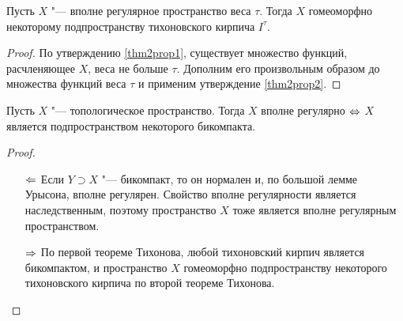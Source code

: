 \begin{theorem}
    Пусть $X$ "--- вполне регулярное пространство веса $\tau$. Тогда $X$ гомеоморфно некоторому подпространству тихоновского кирпича $I^\tau$.
\end{theorem}

\begin{proof}
    По утверждению \ref{thm2prop1}, существует множество функций, расчленяющее $X$, веса не больше $\tau$. Дополним его произвольным образом до множества функций веса $\tau$ и применим утверждение \ref{thm2prop2}.
\end{proof}

\begin{corollary}
    Пусть $X$ "--- топологическое пространство. Тогда $X$ вполне регулярно $\Leftrightarrow$ $X$ является подпространством некоторого бикомпакта.
\end{corollary}

\begin{proof}~
    \begin{itemize}
        \item[$\Leftarrow$] Если $Y \supset X$ "--- бикомпакт, то он нормален и, по большой лемме Урысона, вполне регулярен. Свойство вполне регулярности является наследственным, поэтому пространство $X$ тоже является вполне регулярным пространством.
        
        \item[$\Rightarrow$] По первой теореме Тихонова, любой тихоновский кирпич является бикомпактом, и пространство $X$ гомеоморфно подпространству некоторого тихоновского кирпича по второй теореме Тихонова.\qedhere
    \end{itemize}
\end{proof}
